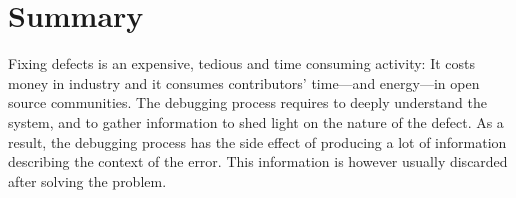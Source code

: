 %
%
%
%



\section{Summary}\label{sec:stacktraces-summary}

Fixing defects is an expensive, tedious and time consuming activity: It costs money in industry and it consumes contributors' time---and energy---in open source communities.
The debugging process requires to deeply understand the system, and to gather information to shed light on the nature of the defect.
As a result, the debugging process has the side effect of producing a lot of information describing the context of the error.
This information is however usually discarded after solving the problem.


